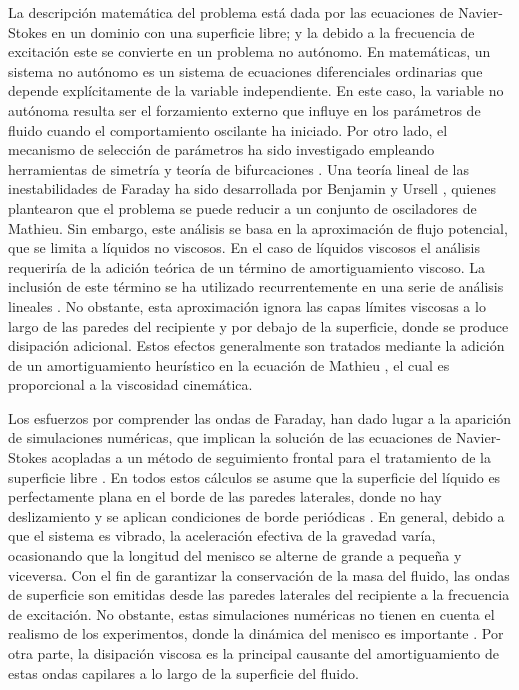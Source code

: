 La descripción matemática del problema está dada por las ecuaciones de Navier-Stokes en un dominio con una superficie libre; y la debido a la frecuencia de excitación este se convierte en un problema no autónomo. En matemáticas, un sistema no autónomo es un sistema de ecuaciones diferenciales ordinarias que depende explícitamente de la variable independiente. En este caso, la variable no autónoma resulta ser el forzamiento externo que influye en los parámetros de fluido cuando el comportamiento oscilante ha iniciado. Por otro lado, el mecanismo de selección de parámetros ha sido investigado empleando herramientas de simetría y teoría de bifurcaciones \cite{silber2000two, rucklidge2003secondary, skeldon2007pattern}. Una teoría lineal de las inestabilidades de Faraday ha sido desarrollada por Benjamin y Ursell \cite{benjamin1954stability}, quienes plantearon que el problema se puede reducir a un conjunto de osciladores de Mathieu. Sin embargo, este análisis se basa en la aproximación de flujo potencial, que se limita a líquidos no viscosos. En el caso de líquidos viscosos el análisis requeriría de la adición teórica de un término de amortiguamiento viscoso. La inclusión de este término se ha utilizado recurrentemente en una serie de análisis lineales \cite{muller1993periodic, kumar1996linear, kumar1994parametric, perlin2000capillary}. No obstante, esta aproximación ignora las capas límites viscosas a lo largo de las paredes del recipiente y por debajo de la superficie, donde se produce disipación adicional. Estos efectos generalmente son tratados mediante la adición de un amortiguamiento heurístico en la ecuación de Mathieu \cite{Landau1987}, el cual es proporcional a la viscosidad cinemática.\medskip \bigskip

Los esfuerzos por comprender las ondas de Faraday, han dado lugar a la aparición de simulaciones numéricas, que implican la solución de las ecuaciones de Navier-Stokes acopladas a un método de seguimiento frontal para el tratamiento de la superficie libre \cite{perinet2009numerical, perinet2012alternating}. En todos estos cálculos se asume que la superficie del líquido es perfectamente plana en el borde de las paredes laterales, donde no hay deslizamiento y se aplican condiciones de borde periódicas \cite{kahouadji2015numerical}. En general, debido a que el sistema es vibrado, la aceleración efectiva de la gravedad varía, ocasionando que la longitud del menisco se alterne de grande a pequeña y viceversa. Con el fin de garantizar la conservación de la masa del fluido, las ondas de superficie son emitidas desde las paredes laterales del recipiente a la frecuencia de excitación. No obstante, estas simulaciones numéricas no tienen en cuenta el realismo de los experimentos, donde la dinámica del menisco es importante \cite{nguyem2011effect}. Por otra parte, la disipación viscosa es la principal causante del amortiguamiento de estas ondas capilares a lo largo de la superficie del fluido. \medskip \bigskip
 
